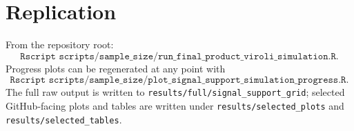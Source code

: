 \documentclass[11pt]{article}
\begin{document}
\section{Replication}

From the repository root:
\[
\texttt{Rscript scripts/sample\_size/run\_final\_product\_viroli\_simulation.R}.
\]
Progress plots can be regenerated at any point with
\[
\texttt{Rscript scripts/sample\_size/plot\_signal\_support\_simulation\_progress.R}.
\]
The full raw output is written to
\texttt{results/full/signal\_support\_grid}; selected GitHub-facing plots and
tables are written under \texttt{results/selected\_plots} and
\texttt{results/selected\_tables}.
\end{document}
